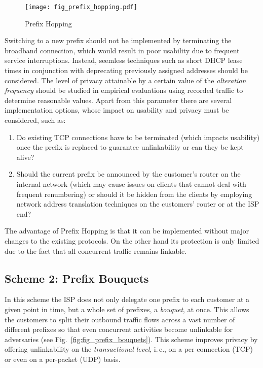 \documentclass{easychair}
\begin{document}
\begin{figure}[htbp]
        \centering
                \texttt{[image: fig\_prefix\_hopping.pdf]}
        \caption{Prefix Hopping}
        \label{fig:fig_prefix_hopping}
\end{figure}

Switching to a new prefix should not be implemented by terminating the broadband connection, which would result in poor usability due to frequent service interruptions. Instead, seemless techniques such as short DHCP lease times in conjunction with deprecating previously assigned addresses should be considered. The level of privacy attainable by a certain value of the \emph{alteration frequency} should be studied in empirical evaluations using recorded traffic to determine reasonable values. Apart from this parameter there are several implementation options, whose impact on usability and privacy must be considered, such as:

\begin{enumerate}
	\item Do existing TCP connections have to be terminated (which impacts usability) once the prefix is replaced to guarantee unlinkability or can they be kept alive?
	\item Should the current prefix be announced by the customer's router on the internal network (which may cause issues on clients that cannot deal with frequent renumbering) or should it be hidden from the clients by employing network address translation techniques on the customers' router or at the ISP end?
\end{enumerate}

The advantage of Prefix Hopping is that it can be implemented without major changes to the existing protocols. On the other hand its protection is only limited due to the fact that all concurrent traffic remains linkable.

\subsection{Scheme 2: Prefix Bouquets}

In this scheme the ISP does not only delegate one prefix to each customer at a given point in time, but a whole set of prefixes, a \emph{bouquet}, at once. This allows the customers to split their outbound traffic flows across a vast number of different prefixes so that even concurrent activities become unlinkable for adversaries (see Fig.~\ref{fig:fig_prefix_bouquets}). This scheme improves privacy by offering unlinkability on the \emph{transactional level}, i.\,e., on a per-connection (TCP) or even on a per-packet (UDP) basis.
\end{document}
